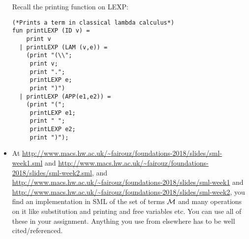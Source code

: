 \documentclass[11pt]{article}
\newcommand \cM {\cal M}
\begin{document}
\begin{itemize}
\begin{verbatim}
\end{verbatim}
Recall the printing function on LEXP:
\noindent
  \begin{verbatim}
(*Prints a term in classical lambda calculus*)
fun printLEXP (ID v) =
    print v
  | printLEXP (LAM (v,e)) =
    (print "(\\";
     print v;
     print ".";
     printLEXP e;
     print ")")
  | printLEXP (APP(e1,e2)) =
    (print "(";
     printLEXP e1;
     print " ";
     printLEXP e2;
     print ")");
\end{verbatim}  
\item
At \url{http://www.macs.hw.ac.uk/~fairouz/foundations-2018/slides/sml-week1.sml} and \url{http://www.macs.hw.ac.uk/~fairouz/foundations-2018/slides/sml-week2.sml}, and
\url{http://www.macs.hw.ac.uk/~fairouz/foundations-2018/slides/sml-week1} and \url{http://www.macs.hw.ac.uk/~fairouz/foundations-2018/slides/sml-week2}, 
you find an implementation in SML of the set of
terms $\cM$ and many operations on it like substitution and printing and free variables etc.  You can use all of these in your assignment.    Anything you use from elsewhere has to be well cited/referenced.
\end{itemize}
\end{document}
